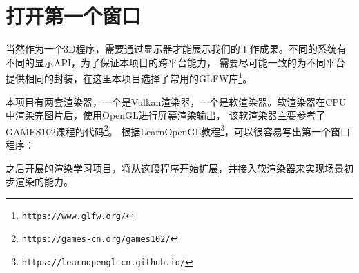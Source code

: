 \section{打开第一个窗口}
当然作为一个3D程序，需要通过显示器才能展示我们的工作成果。不同的系统有不同的显示API，为了保证本项目的跨平台能力，
需要尽可能一致的为不同平台提供相同的封装，在这里本项目选择了常用的GLFW库\footnote{\nolinkurl{https://www.glfw.org/}}。

本项目有两套渲染器，一个是Vulkan渲染器，一个是软渲染器。软渲染器在CPU中渲染完图片后，使用OpenGL进行屏幕渲染输出，
该软渲染器主要参考了GAMES102课程的代码\footnote{\nolinkurl{https://games-cn.org/games102/}}。
根据LearnOpenGL教程\footnote{\nolinkurl{https://learnopengl-cn.github.io/}}，可以很容易写出第一个窗口程序：



之后开展的渲染学习项目，将从这段程序开始扩展，并接入软渲染器来实现场景初步渲染的能力。
